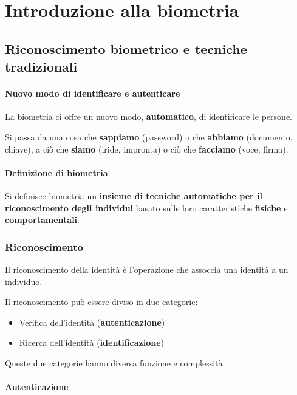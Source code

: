 \chapter{Introduzione alla biometria}

\section{Riconoscimento biometrico e tecniche tradizionali}

\subsubsection{Nuovo modo di identificare e autenticare}

La biometria ci offre un nuovo modo, \textbf{automatico}, di identificare le persone.

Si passa da una cosa che \textbf{sappiamo} (password) o che \textbf{abbiamo} (documento, chiave), a ciò che \textbf{siamo} (iride, impronta) o ciò che \textbf{facciamo} (voce, firma).

\subsubsection{Definizione di biometria}

Si definisce biometria un \textbf{insieme di tecniche automatiche per il riconoscimento degli individui} basato sulle loro caratteristiche \textbf{fisiche} e \textbf{comportamentali}.

\subsection{Riconoscimento}

Il riconoscimento della identità è l'operazione che assoccia una identità a un individuo.

Il riconoscimento può essere diviso in due categorie:
\begin{itemize}
    \item Verifica dell'identità (\textbf{autenticazione})
    \item Ricerca dell'identità (\textbf{identificazione})
\end{itemize}
Queste due categorie hanno diversa funzione e complessità.

\subsubsection{Autenticazione}

